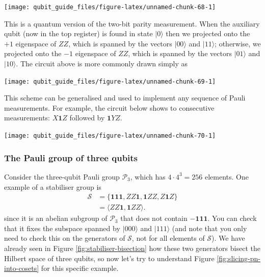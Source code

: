 \documentclass[fleqn,a4paper]{article}
\theoremstyle{definition}
\theoremstyle{definition}
\theoremstyle{definition}
\theoremstyle{definition}
\theoremstyle{remark}
\begin{document}
\begin{center}\texttt{[image: qubit\_guide\_files/figure-latex/unnamed-chunk-68-1]} \end{center}

This is a quantum version of the two-bit parity measurement.
When the auxiliary qubit (now in the top register) is found in state \(|0\rangle\) then we projected onto the \(+1\) eigenspace of \(ZZ\), which is spanned by the vectors \(|00\rangle\) and \(|11\rangle\); otherwise, we projected onto the \(-1\) eigenspace of \(ZZ\), which is spanned by the vectors \(|01\rangle\) and \(|10\rangle\).
The circuit above is more commonly drawn simply as

\begin{center}\texttt{[image: qubit\_guide\_files/figure-latex/unnamed-chunk-69-1]} \end{center}

This scheme can be generalised and used to implement any sequence of Pauli measurements.
For example, the circuit below shows to consecutive measurements: \(X\mathbf{1}Z\) followed by \(\mathbf{1}YZ\).

\begin{center}\texttt{[image: qubit\_guide\_files/figure-latex/unnamed-chunk-70-1]} \end{center}

\hypertarget{pauli-group-three-qubits-worked-example}{%
\subsubsection{The Pauli group of three qubits}\label{pauli-group-three-qubits-worked-example}}

Consider the three-qubit Pauli group \(\mathcal{P}_3\), which has \(4\cdot 4^3=256\) elements.
One example of a stabiliser group is
\[
  \begin{aligned}
    \mathcal{S}
    &= \{\mathbf{1}\mathbf{1}\mathbf{1},ZZ\mathbf{1},\mathbf{1}ZZ, Z\mathbf{1}Z\}
  \\&= \langle ZZ\mathbf{1},\mathbf{1}ZZ\rangle.
  \end{aligned}
\]
since it is an abelian subgroup of \(\mathcal{P}_3\) that does not contain \(-\mathbf{1}\mathbf{1}\mathbf{1}\).
You can check that it fixes the subspace spanned by \(|000\rangle\) and \(|111\rangle\) (and note that you only need to check this on the generators of \(\mathcal{S}\), not for all elements of \(\mathcal{S}\)).
We have already seen in Figure \ref{fig:stabiliser-bisection} how these two generators bisect the Hilbert space of three qubits, so now let's try to understand Figure \ref{fig:slicing-pn-into-cosets} for this specific example.
\end{document}
